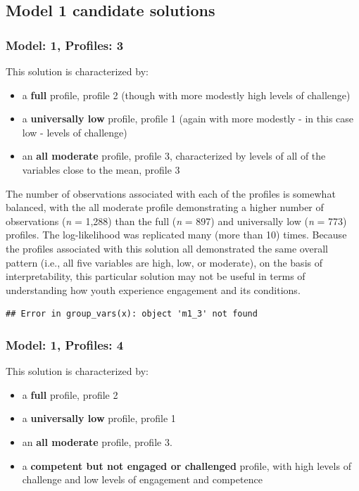 \documentclass[]{book}
\providecommand{\tightlist}{%
  \setlength{\itemsep}{0pt}\setlength{\parskip}{0pt}}
\theoremstyle{definition}
\theoremstyle{definition}
\theoremstyle{definition}
\theoremstyle{remark}
\begin{document}
\subsection{Model 1 candidate
solutions}\label{model-1-candidate-solutions}

\subsubsection{Model: 1, Profiles: 3}\label{model-1-profiles-3}

This solution is characterized by:

\begin{itemize}
\tightlist
\item
  a \textbf{full} profile, profile 2 (though with more modestly high
  levels of challenge)
\item
  a \textbf{universally low} profile, profile 1 (again with more
  modestly - in this case low - levels of challenge)
\item
  an \textbf{all moderate} profile, profile 3, characterized by levels
  of all of the variables close to the mean, profile 3
\end{itemize}

The number of observations associated with each of the profiles is
somewhat balanced, with the all moderate profile demonstrating a higher
number of observations (\emph{n} = 1,288) than the full (\emph{n} = 897)
and universally low (\emph{n} = 773) profiles. The log-likelihood was
replicated many (more than 10) times. Because the profiles associated
with this solution all demonstrated the same overall pattern (i.e., all
five variables are high, low, or moderate), on the basis of
interpretability, this particular solution may not be useful in terms of
understanding how youth experience engagement and its conditions.

\begin{verbatim}
## Error in group_vars(x): object 'm1_3' not found
\end{verbatim}

\subsubsection{Model: 1, Profiles: 4}\label{model-1-profiles-4}

This solution is characterized by:

\begin{itemize}
\tightlist
\item
  a \textbf{full} profile, profile 2
\item
  a \textbf{universally low} profile, profile 1
\item
  an \textbf{all moderate} profile, profile 3.
\item
  a \textbf{competent but not engaged or challenged} profile, with high
  levels of challenge and low levels of engagement and competence
\end{itemize}
\end{document}
